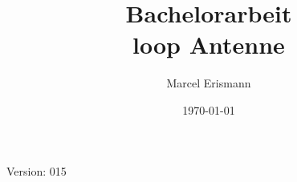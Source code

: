 \documentclass[10pt,a4paper]{article}
\author{Marcel Erismann}
\date{\today}
\title{Bachelorarbeit \\ \footnotesize{loop Antenne}}
\begin{document}
	
	Version: 015
	\tableofcontents 
	\newpage
	
\end{document}
